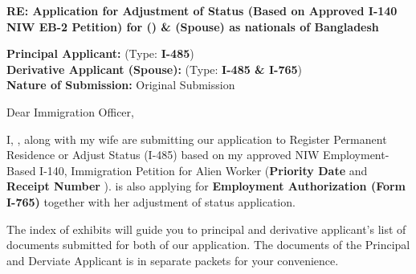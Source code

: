 \documentclass{letter}
\date{July 01, 2024}
\begin{document}
% 
\begin{letter}{\USCISaddress

\vspace{0.5cm}

\textbf{RE: Application for Adjustment of Status (Based on Approved I-140 NIW EB-2 Petition)
for \textit{\pApplicant} (\Anum) \& \textit{\dApplicant} (Spouse) as nationals of Bangladesh }
\vspace{0.5cm}

\textbf{Principal Applicant:} \pApplicant  ({Type:} \textbf{I-485})\\
\textbf{Derivative Applicant (Spouse):} \dApplicant  ({Type:} \textbf{I-485 \& I-765})\\
\textbf{Nature of Submission:} Original Submission \\

}






\opening{Dear Immigration Officer,}


I, \textbf{\pApplicant}, along with  my wife \textbf{\dApplicant} are submitting our application to Register Permanent Residence or Adjust Status (I-485) based on my approved NIW Employment-Based I-140, Immigration Petition for Alien Worker (\textbf{Priority Date \priorityDate} and \textbf{Receipt Number \ReceiptNumber}).\textbf{\dApplicant} is also applying for \textbf{Employment Authorization (Form I-765)} together with her adjustment of status application.


The index of exhibits will guide you to principal and derivative applicant's list of documents submitted for both of our application. The documents of the Principal and Derviate Applicant is in separate packets for your convenience.



\end{letter}
\end{document}
